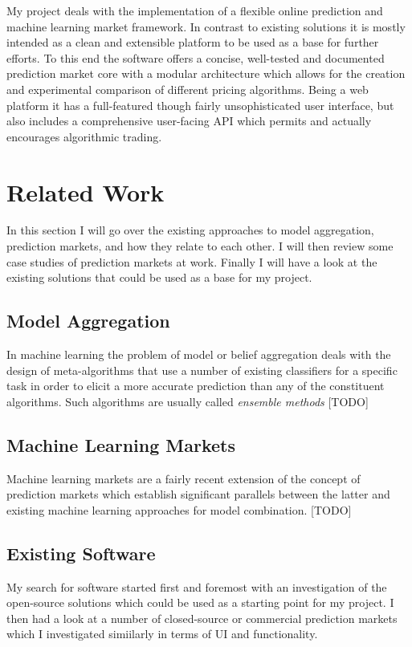 \documentclass[bsc,frontabs,twoside,singlespacing,parskip,deptreport]{infthesis}     %
\begin{document}
	My project deals with the implementation of a flexible online prediction and machine learning market framework. In contrast to existing solutions  it is mostly intended as a clean and extensible platform to be used as a base for further efforts. To this end the software offers a concise, well-tested and documented prediction market core with a modular architecture which allows for the creation and experimental comparison of different pricing algorithms. Being a web platform it has a full-featured though fairly unsophisticated user interface, but also includes a comprehensive user-facing API which permits and actually encourages algorithmic trading. 
	

\chapter{Related Work}

	In this section I will go over the existing approaches to model aggregation, prediction markets, and how they relate to each other. I will then review some case studies of prediction markets at work. Finally I will have a look at the existing solutions that could be used as a base for my project. 

\section{Model Aggregation}
	In machine learning the problem of model or belief aggregation deals with the design of meta-algorithms that use a number of existing classifiers for a specific task in order to elicit a more accurate prediction than any of the constituent algorithms. Such algorithms are usually called {\em ensemble methods} [TODO]

\section{Machine Learning Markets}
    Machine learning markets are a fairly recent extension of the concept of prediction markets which establish significant parallels between the latter and existing machine learning approaches for model combination.  [TODO]

\section{Existing Software}
% 
	My search for software started first and foremost with an investigation of the open-source solutions which could be used as a starting point for my project. I then had a look at a number of closed-source or commercial prediction markets which I investigated simiilarly in terms of UI and functionality.   
	
\end{document}
